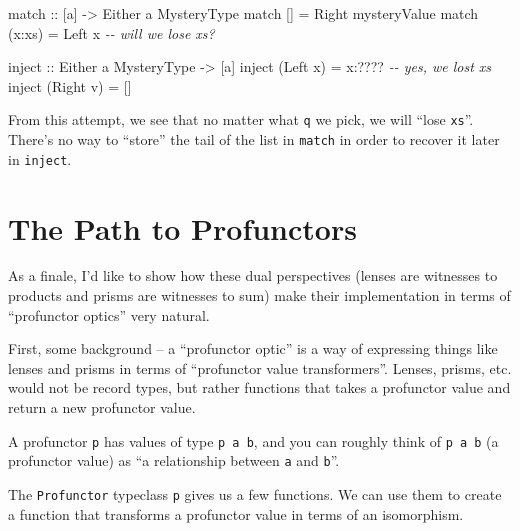 \documentclass[]{article}
\newenvironment{Shaded}{}{}
\newcommand{\CommentTok}[1]{\textcolor[rgb]{0.38,0.63,0.69}{\textit{#1}}}
\newcommand{\DataTypeTok}[1]{\textcolor[rgb]{0.56,0.13,0.00}{#1}}
\newcommand{\NormalTok}[1]{#1}
\newcommand{\OperatorTok}[1]{\textcolor[rgb]{0.40,0.40,0.40}{#1}}
\newcommand{\OtherTok}[1]{\textcolor[rgb]{0.00,0.44,0.13}{#1}}
\begin{document}
\begin{Shaded}
\begin{Highlighting}[]
\OtherTok{match ::}\NormalTok{ [a] }\OtherTok{{-}\textgreater{}} \DataTypeTok{Either}\NormalTok{ a }\DataTypeTok{MysteryType}
\NormalTok{match []     }\OtherTok{=} \DataTypeTok{Right}\NormalTok{ mysteryValue}
\NormalTok{match (x}\OperatorTok{:}\NormalTok{xs) }\OtherTok{=} \DataTypeTok{Left}\NormalTok{ x                       }\CommentTok{{-}{-} will we lose \textasciigrave{}xs\textasciigrave{}?}

\OtherTok{inject ::} \DataTypeTok{Either}\NormalTok{ a }\DataTypeTok{MysteryType} \OtherTok{{-}\textgreater{}}\NormalTok{ [a]}
\NormalTok{inject (}\DataTypeTok{Left}\NormalTok{ x)  }\OtherTok{=}\NormalTok{ x}\OperatorTok{:????}                   \CommentTok{{-}{-} yes, we lost \textasciigrave{}xs\textasciigrave{}}
\NormalTok{inject (}\DataTypeTok{Right}\NormalTok{ v) }\OtherTok{=}\NormalTok{ []}
\end{Highlighting}
\end{Shaded}

From this attempt, we see that no matter what \texttt{q} we pick, we will ``lose
\texttt{xs}''. There's no way to ``store'' the tail of the list in
\texttt{match} in order to recover it later in \texttt{inject}.

\section{The Path to Profunctors}\label{the-path-to-profunctors}

As a finale, I'd like to show how these dual perspectives (lenses are witnesses
to products and prisms are witnesses to sum) make their implementation in terms
of ``profunctor optics'' very natural.

First, some background -- a ``profunctor optic'' is a way of expressing things
like lenses and prisms in terms of ``profunctor value transformers''. Lenses,
prisms, etc. would not be record types, but rather functions that takes a
profunctor value and return a new profunctor value.

A profunctor \texttt{p} has values of type \texttt{p\ a\ b}, and you can roughly
think of \texttt{p\ a\ b} (a profunctor value) as ``a relationship between
\texttt{a} and \texttt{b}''.

The \texttt{Profunctor} typeclass \texttt{p} gives us a few functions. We can
use them to create a function that transforms a profunctor value in terms of an
isomorphism.
\end{document}
